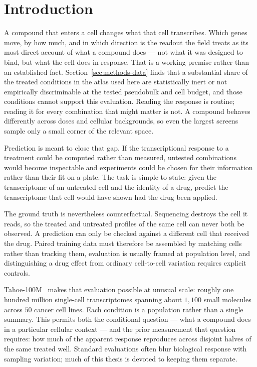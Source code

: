 \section{Introduction}
\label{sec:introduction}

A compound that enters a cell changes what that cell transcribes. Which genes move, by how much,
and in which direction is the readout the field treats as its most direct account of what a compound
does --- not what it was designed to bind, but what the cell does in response. That is a working
premise rather than an established fact. Section~\ref{sec:methods-data} finds that a substantial
share of the treated conditions in the atlas used here are statistically inert or not empirically
discriminable at the tested pseudobulk and cell budget, and those conditions cannot support this
evaluation. Reading the response is routine; reading it for every combination that might matter is
not. A compound behaves differently across doses and cellular backgrounds, so even the largest
screens sample only a small corner of the relevant space.

Prediction is meant to close that gap. If the transcriptional response to a treatment could be
computed rather than measured, untested combinations would become inspectable and experiments
could be chosen for their information rather than their fit on a plate. The task is simple to state:
given the transcriptome of an untreated cell and the identity of a drug, predict the transcriptome
that cell would have shown had the drug been applied.

The ground truth is nevertheless counterfactual. Sequencing destroys the cell it reads, so the
treated and untreated profiles of the same cell can never both be observed. A prediction can only
be checked against a different cell that received the drug. Paired training data must therefore be
assembled by matching cells rather than tracking them, evaluation is usually framed at population
level, and distinguishing a drug effect from ordinary cell-to-cell variation requires explicit
controls.

Tahoe-100M~\cite{tahoe100m} makes that evaluation possible at unusual scale: roughly one hundred
million single-cell transcriptomes spanning about $1{,}100$ small molecules across $50$ cancer
cell lines. Each condition is a population rather than a single summary. This permits both the
conditional question --- what a compound does in a particular cellular context --- and the prior
measurement that question requires: how much of the apparent response reproduces across disjoint
halves of the same treated well. Standard evaluations often blur biological response with sampling
variation; much of this thesis is devoted to keeping them separate.

